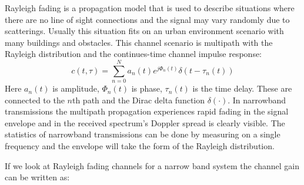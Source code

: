 

Rayleigh fading is a propagation model that is used to describe situations where there are no line of sight connections and the signal may vary randomly due to scatterings. Usually this situation fits on an urban environment scenario with many buildings and obstacles. This channel scenario is multipath with the Rayleigh distribution and the continues-time channel impulse response:
\begin{equation}
c(t,\tau) = \sum_{n =0}^{N} a_n(t)e^{j\Phi_n(t)} \delta (t-\tau_n(t))
\end{equation}
Here $a_n(t)$ is amplitude, $\Phi_n(t)$ is phase, $\tau_n(t)$ is the time delay. These are connected to the $n$th path and the Dirac delta function $\delta(\cdot)$.
In narrowband transmissions  the multipath propagation experiences rapid fading in the signal envelope and in the received spectrum's Doppler spread is clearly visible. The statistics of narrowband transmissions can be done by measuring on a  single frequency and the envelope will take the form of the Rayleigh distribution. 

If we look at Rayleigh fading channels for a narrow band system the channel gain can be written as:

